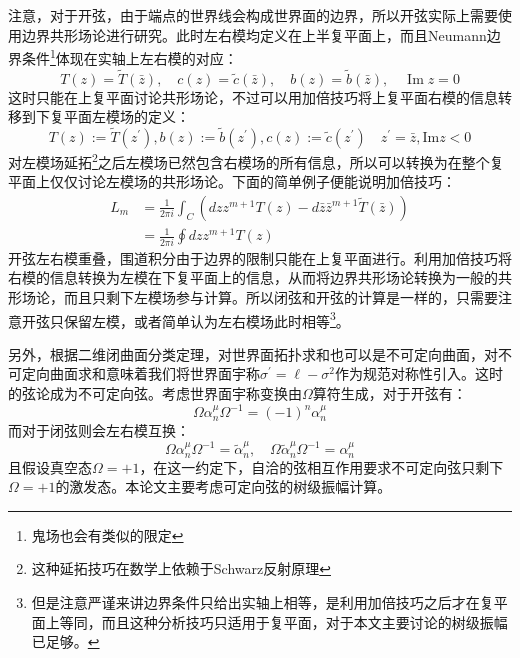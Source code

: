 注意，对于开弦，由于端点的世界线会构成世界面的边界，所以开弦实际上需要使用边界共形场论进行研究。此时左右模均定义在上半复平面上，而且Neumann边界条件\footnote{鬼场也会有类似的限定}体现在实轴上左右模的对应：
\begin{equation}
	T(z)=\tilde{T}(\bar{z}),\quad c(z)=\tilde{c}(\bar{z}),\quad b(z)=\tilde{b}(\bar{z}),\quad\operatorname{Im}z=0
\end{equation}
这时只能在上复平面讨论共形场论，不过可以用加倍技巧将上复平面右模的信息转移到下复平面左模场的定义：
\begin{equation}
	\label{eq:2.35}
	T(z):= \tilde T({z}^{\prime}),b(z):= \tilde b({z}^{\prime}),c(z):= \tilde c({z}^{\prime})\quad z^\prime = \bar z,\mathrm{Im}z<0
\end{equation}
对左模场延拓\footnote{这种延拓技巧在数学上依赖于Schwarz反射原理}之后左模场已然包含右模场的所有信息，所以可以转换为在整个复平面上仅仅讨论左模场的共形场论。下面的简单例子便能说明加倍技巧：
\begin{equation}
	\begin{aligned}
		L_m&=\frac{1}{2\pi i}\int_C\left(dzz^{m+1}T(z)-d\bar{z}\bar{z}^{m+1}\tilde{T}(\bar z)\right)
		\\&=\frac{1}{2\pi i}\oint dzz^{m+1}T(z)
	\end{aligned}
\end{equation}
开弦左右模重叠，围道积分由于边界的限制只能在上复平面进行。利用加倍技巧将右模的信息转换为左模在下复平面上的信息，从而将边界共形场论转换为一般的共形场论，而且只剩下左模场参与计算。所以闭弦和开弦的计算是一样的，只需要注意开弦只保留左模，或者简单认为左右模场此时相等\footnote{但是注意严谨来讲边界条件只给出实轴上相等，是利用加倍技巧之后才在复平面上等同，而且这种分析技巧只适用于复平面，对于本文主要讨论的树级振幅已足够。}。

另外，根据二维闭曲面分类定理，对世界面拓扑求和也可以是不可定向曲面，对不可定向曲面求和意味着我们将世界面宇称$\sigma^{\prime}=\ell-\sigma^2$作为规范对称性引入。这时的弦论成为不可定向弦。考虑世界面宇称变换由$\Omega$算符生成，对于开弦有：
\begin{equation}
	\Omega\alpha_n^\mu\Omega^{-1}=(-1)^n\alpha_n^\mu
\end{equation}
而对于闭弦则会左右模互换：
\begin{equation}
	\Omega\alpha_n^\mu\Omega^{-1}=\tilde\alpha_n^\mu,\quad \Omega\tilde\alpha_n^\mu\Omega^{-1}=\alpha_n^\mu
\end{equation}
且假设真空态$\Omega=+1$，在这一约定下，自洽的弦相互作用要求不可定向弦只剩下$\Omega=+1$的激发态。本论文主要考虑可定向弦的树级振幅计算。
